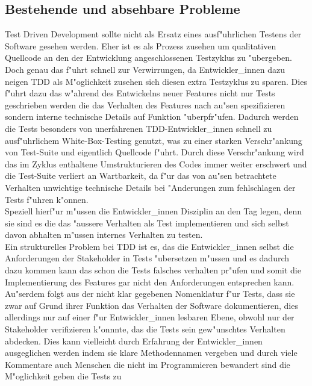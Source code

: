   \subsection{Bestehende und absehbare Probleme}
    Test Driven Development sollte nicht als Ersatz eines ausf"uhrlichen Testens
    der Software gesehen werden. Eher ist es als Prozess zusehen um qualitativen
    Quellcode an den der Entwicklung angeschlossenen Testzyklus zu "ubergeben.\\
    Doch genau das f"uhrt schnell zur Verwirrungen, da Entwickler\_innen dazu
    neigen TDD als M"oglichkeit zusehen sich diesen extra Testzyklus zu sparen.
    Dies f"uhrt dazu das w"ahrend des Entwickelns neuer Features nicht nur 
    Tests geschrieben werden die das Verhalten des Features nach au"sen spezifizieren
    sondern interne technische Details auf Funktion "uberpfr"ufen. Dadurch werden
    die Tests besonders von unerfahrenen TDD-Entwickler\_innen schnell zu 
    ausf"uhrlichem White-Box-Testing genutzt, was zu einer starken Verschr"ankung
    von Test-Suite und eigentlich Quellcode f"uhrt. Durch diese Verschr"ankung
    wird das im Zyklus enthaltene Umstrukturieren des Codes immer weiter 
    erschwert und die Test-Suite verliert an Wartbarkeit, da f"ur das von au"sen
    betrachtete Verhalten unwichtige technische Details bei "Anderungen zum 
    fehlschlagen der Tests f"uhren k"onnen.\\
    Speziell hierf"ur m"ussen die Entwickler\_innen Disziplin an den Tag legen,
    denn sie sind es die das "aussere Verhalten als Test implementieren und sich
    selbst davon abhalten m"ussen internes Verhalten zu testen.\\
    Ein strukturelles Problem bei TDD ist es, das die Entwickler\_innen selbst
    die Anforderungen der Stakeholder in Tests "ubersetzen m"ussen und es 
    dadurch dazu kommen kann das schon die Tests falsches verhalten pr"ufen
    und somit die Implementierung des Features gar nicht den Anforderungen 
    entsprechen kann. Au"serdem folgt aus der nicht klar gegebenen Nomenklatur
    f"ur Tests, dass sie zwar auf Grund ihrer Funktion das Verhalten der 
    Software dokumentieren, dies allerdings nur auf einer f"ur Entwickler\_innen
    lesbaren Ebene, obwohl nur der Stakeholder verifizieren k"onnnte, das die 
    Tests sein gew"unschtes Verhalten abdecken. Dies kann vielleicht durch 
    Erfahrung der Entwickler\_innen ausgeglichen werden indem sie klare 
    Methodennamen vergeben und durch viele Kommentare auch Menschen die nicht 
    im Programmieren bewandert sind die M"oglichkeit geben die Tests zu 
